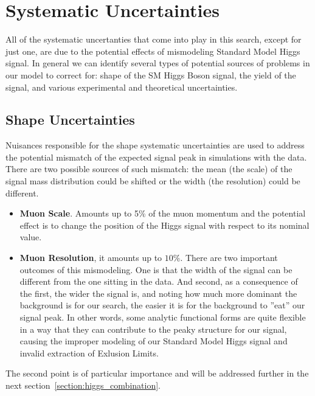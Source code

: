 \section{Systematic Uncertainties} \label{section:higgs_systematics}
All of the systematic uncertanties that come into play in this search, except for just one, are due to the potential effects of mismodeling Standard Model Higgs signal. In general we can identify several types of potential sources of problems in our model to correct for: shape of the SM Higgs Boson signal, the yield of the signal, and various experimental and theoretical uncertainties.

\subsection{Shape Uncertainties}
Nuisances responsible for the shape systematic uncertainties are used to address the potential mismatch of the expected signal peak in simulations with the data. There are two possible sources of such mismatch: the mean (the scale) of the signal mass distribution could be shifted or the width (the resolution) could be different.
\begin{itemize}
    \item {\bf Muon Scale}. Amounts up to 5\% of the muon momentum and the potential effect is to change the position of the Higgs signal with respect to its nominal value.
    \item {\bf Muon Resolution}, it amounts up to $10\%$. There are two important outcomes of this mismodeling. One is that the width of the signal can be different from the one sitting in the data. And second, as a consequence of the first, the wider the signal is, and noting how much more dominant the background is for our search, the easier it is for the background to ''eat'' our signal peak. In other words, some analytic functional forms are quite flexible in a way that they can contribute to the peaky structure for our signal, causing the improper modeling of our Standard Model Higgs signal and invalid extraction of Exlusion Limits.
\end{itemize}
The second point is of particular importance and will be addressed further in the next section~\ref{section:higgs_combination}.

